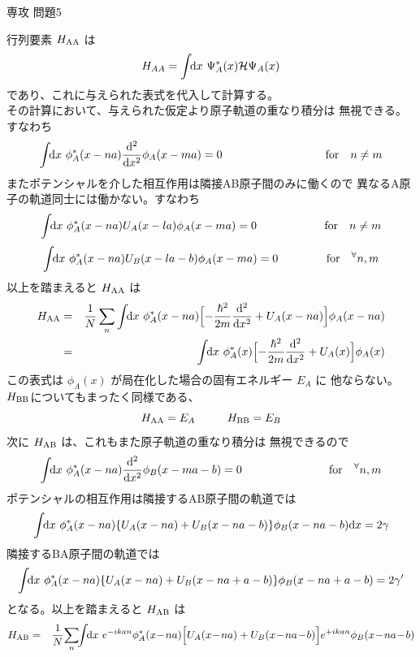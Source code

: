 \documentclass[fleqn]{jbook}
\begin{document}
\begin{answer}{専攻 問題5}{}
\begin{subanswers}
\begin{subsubanswers}
  \SubSubAnswer
    行列要素 $H_{\rm AA}$ は
%
    \[ H_{AA}%
       = \Uint{\d{x}} \Psi_A^{\ast}(x) {\cal H} \Psi_A(x) \]
%
    であり、これに与えられた表式を代入して計算する。\\
%
    その計算において、与えられた仮定より原子軌道の重なり積分は
    無視できる。すなわち
%
    \[ \Uint{\d{x}} \phi_A^{\ast}(x-na) \Deriver{^2}{x^2} \phi_A(x-ma) = 0%
       \hspace{32mm} {\rm for}\quad n \neq m \]
%
    またポテンシャルを介した相互作用は隣接AB原子間のみに働くので
    異なるA原子の軌道同士には働かない。すなわち
%
    \[ \Uint{\d{x}} \phi_A^{\ast}(x-na) U_A(x-la) \phi_A(x-ma) = 0%
       \hspace{21mm} {\rm for}\quad n \neq m \]
    \[ \Uint{\d{x}} \phi_A^{\ast}(x-na) U_B(x-la-b) \phi_A(x-ma) = 0%
       \hspace{15mm} {\rm for}\quad ^{\forall} n,m \]
%
    以上を踏まえると $H_{\rm AA}$ は
%
    \begin{eqnarray*}
      H_{\rm AA} &=& \frac{1}{N} \sum_{n} \Uint{\d{x}}%
                 \phi_A^{\ast}(x-na)\Bigl[%
                   -\frac{\hbar^2}{2m}\Deriver{^2}{x^2} + U_A(x-na)
                 \Bigr]\phi_A(x-na) \\
             &=& \Uint{\d{x}} \phi_A^{\ast}(x)\Bigl[%
                   -\frac{\hbar^2}{2m}\Deriver{^2}{x^2} + U_A(x)
                 \Bigr]\phi_A(x)
    \end{eqnarray*}
%
    この表式は $\phi_A(x)$ が局在化した場合の固有エネルギー $E_A$ に
    他ならない。 $H_{\rm BB}$についてもまったく同様である、
%
    \[ H_{\rm AA} = E_A \hspace{10mm} H_{\rm BB} = E_B \]
%
    次に $H_{\rm AB}$ は、これもまた原子軌道の重なり積分は
    無視できるので
%
    \[ \Uint{\d{x}} \phi_A^{\ast}(x-na) \Deriver{^2}{x^2} \phi_B(x-ma-b) = 0%
       \hspace{27mm} {\rm for}\quad ^{\forall} n,m \]
%
    ポテンシャルの相互作用は隣接するAB原子間の軌道では
%
    \[ \Uint{\d{x}} \phi_A^{\ast}(x-na)%
         \{U_A(x-na)+U_B(x-na-b)\}
       \phi_B(x-na-b)\d{x} = 2\gamma  \]
%
    隣接するBA原子間の軌道では
%
    \[ \Uint{\d{x}} \phi_A^{\ast}(x-na)%
         \{U_A(x-na)+U_B(x-na+a-b)\}
       \phi_B(x-na+a-b) = 2\gamma' \]
%
    となる。以上を踏まえると $H_{\rm AB}$ は
%
    \begin{eqnarray*}
      H_{\rm AB} &=& \frac{1}{N}\! \sum_{n}\!\! \Uint{\d{x}}%
                 e^{-ikan}\phi_A^{\ast}(x\!-\!na)\Bigl[%
                   U_A(x\!-\!na)+U_B(x\!-\!na\!-\!b)
                 \Bigr]e^{+ikan}\phi_B(x\!-\!na\!-\!b) \\

\end{eqnarray*}
\end{subsubanswers}
\end{subanswers}
\end{answer}
\end{document}
